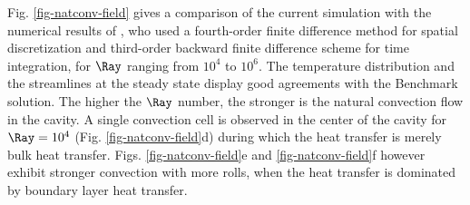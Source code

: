 Fig. \ref{fig-natconv-field} gives a comparison of the current simulation with the numerical results of \cite{Wakashima-2004}, who
used a fourth-order finite difference method for spatial discretization and third-order backward finite difference scheme for time integration, for $\Ray$ ranging from $10^4$ to $10^6$.
The temperature distribution and the streamlines at the steady state display good agreements with the Benchmark solution.
The higher the $\Ray$ number, the stronger is the natural convection flow in the cavity.
A single convection cell is observed in the center of the cavity for $\Ray = 10^4$ (Fig. \ref{fig-natconv-field}d) during which the heat transfer is merely bulk heat transfer.
Figs. \ref{fig-natconv-field}e and \ref{fig-natconv-field}f however exhibit stronger convection with more rolls, when the heat transfer is dominated by boundary layer heat transfer.

